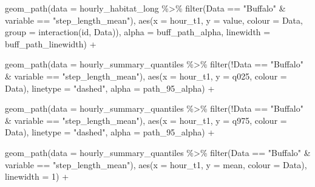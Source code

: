 \documentclass[
  letterpaper,
  DIV=11,
  numbers=noendperiod]{scrartcl}
\newenvironment{Shaded}{\begin{snugshade}}{\end{snugshade}}
\newcommand{\AttributeTok}[1]{\textcolor[rgb]{0.40,0.45,0.13}{#1}}
\newcommand{\DecValTok}[1]{\textcolor[rgb]{0.68,0.00,0.00}{#1}}
\newcommand{\FunctionTok}[1]{\textcolor[rgb]{0.28,0.35,0.67}{#1}}
\newcommand{\NormalTok}[1]{\textcolor[rgb]{0.00,0.23,0.31}{#1}}
\newcommand{\SpecialCharTok}[1]{\textcolor[rgb]{0.37,0.37,0.37}{#1}}
\newcommand{\StringTok}[1]{\textcolor[rgb]{0.13,0.47,0.30}{#1}}
\begin{document}
\begin{Shaded}
\begin{Highlighting}[]
  \FunctionTok{geom\_path}\NormalTok{(}\AttributeTok{data =}\NormalTok{ hourly\_habitat\_long }\SpecialCharTok{\%\textgreater{}\%} 
              \FunctionTok{filter}\NormalTok{(Data }\SpecialCharTok{==} \StringTok{"Buffalo"} \SpecialCharTok{\&}\NormalTok{ variable }\SpecialCharTok{==} \StringTok{"step\_length\_mean"}\NormalTok{),}
                 \FunctionTok{aes}\NormalTok{(}\AttributeTok{x =}\NormalTok{ hour\_t1, }\AttributeTok{y =}\NormalTok{ value, }\AttributeTok{colour =}\NormalTok{ Data, }\AttributeTok{group =} \FunctionTok{interaction}\NormalTok{(id, Data)),}
                 \AttributeTok{alpha =}\NormalTok{ buff\_path\_alpha,}
              \AttributeTok{linewidth =}\NormalTok{ buff\_path\_linewidth) }\SpecialCharTok{+}
  
  \FunctionTok{geom\_path}\NormalTok{(}\AttributeTok{data =}\NormalTok{ hourly\_summary\_quantiles }\SpecialCharTok{\%\textgreater{}\%} 
              \FunctionTok{filter}\NormalTok{(}\SpecialCharTok{!}\NormalTok{Data }\SpecialCharTok{==} \StringTok{"Buffalo"} \SpecialCharTok{\&}\NormalTok{ variable }\SpecialCharTok{==} \StringTok{"step\_length\_mean"}\NormalTok{),}
              \FunctionTok{aes}\NormalTok{(}\AttributeTok{x =}\NormalTok{ hour\_t1, }\AttributeTok{y =}\NormalTok{ q025, }\AttributeTok{colour =}\NormalTok{ Data),}
            \AttributeTok{linetype =} \StringTok{"dashed"}\NormalTok{,}
              \AttributeTok{alpha =}\NormalTok{ path\_95\_alpha) }\SpecialCharTok{+}

  \FunctionTok{geom\_path}\NormalTok{(}\AttributeTok{data =}\NormalTok{ hourly\_summary\_quantiles }\SpecialCharTok{\%\textgreater{}\%} 
              \FunctionTok{filter}\NormalTok{(}\SpecialCharTok{!}\NormalTok{Data }\SpecialCharTok{==} \StringTok{"Buffalo"} \SpecialCharTok{\&}\NormalTok{ variable }\SpecialCharTok{==} \StringTok{"step\_length\_mean"}\NormalTok{),}
              \FunctionTok{aes}\NormalTok{(}\AttributeTok{x =}\NormalTok{ hour\_t1, }\AttributeTok{y =}\NormalTok{ q975, }\AttributeTok{colour =}\NormalTok{ Data),}
            \AttributeTok{linetype =} \StringTok{"dashed"}\NormalTok{,}
              \AttributeTok{alpha =}\NormalTok{ path\_95\_alpha) }\SpecialCharTok{+}
  
  \FunctionTok{geom\_path}\NormalTok{(}\AttributeTok{data =}\NormalTok{ hourly\_summary\_quantiles }\SpecialCharTok{\%\textgreater{}\%} 
              \FunctionTok{filter}\NormalTok{(Data }\SpecialCharTok{==} \StringTok{"Buffalo"} \SpecialCharTok{\&}\NormalTok{ variable }\SpecialCharTok{==} \StringTok{"step\_length\_mean"}\NormalTok{),}
              \FunctionTok{aes}\NormalTok{(}\AttributeTok{x =}\NormalTok{ hour\_t1, }\AttributeTok{y =}\NormalTok{ mean, }\AttributeTok{colour =}\NormalTok{ Data),}
              \AttributeTok{linewidth =} \DecValTok{1}\NormalTok{) }\SpecialCharTok{+}
  

\end{Highlighting}
\end{Shaded}
\end{document}

